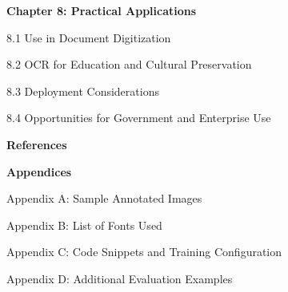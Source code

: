 \begin{adjustwidth}{0.2cm}{0.2cm}
    \vspace{0.5cm}
    {\large \textbf{Chapter 8: Practical Applications}\dotfill\pageref{ch:applications}\par}
    {\large 8.1 Use in Document Digitization\dotfill\pageref{sec:digitization}\par}
    {\large 8.2 OCR for Education and Cultural Preservation\dotfill\pageref{sec:preservation}\par}
    {\large 8.3 Deployment Considerations\dotfill\pageref{sec:deployment}\par}
    {\large 8.4 Opportunities for Government and Enterprise Use\dotfill\pageref{sec:opportunities}\par}

    \vspace{0.5cm}
    {\large \textbf{References}\dotfill\pageref{references}\par}

    \vspace{0.5cm}
    {\large \textbf{Appendices}\par}
    {\large Appendix A: Sample Annotated Images\dotfill\pageref{appendix-a}\par}
    {\large Appendix B: List of Fonts Used\dotfill\pageref{appendix-b}\par}
    {\large Appendix C: Code Snippets and Training Configuration\dotfill\pageref{appendix-c}\par}
    {\large Appendix D: Additional Evaluation Examples\dotfill\pageref{appendix-d}\par}

\end{adjustwidth}
